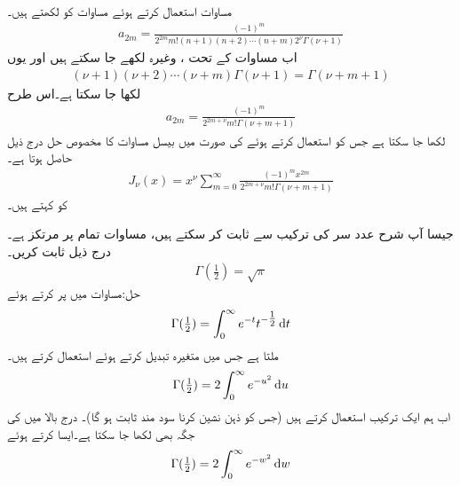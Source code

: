 مساوات  استعمال کرتے ہوئے  مساوات  کو لکھتے ہیں۔
\begin{align*}
a_{2m}=\frac{(-1)^m }{2^{2m}m!(n+1)(n+2)\cdots (n+m)2^{\nu}\Gamma(\nu+1)}
\end{align*}
اب مساوات  کے تحت ، 
 وغیرہ لکھے جا سکتے ہیں اور یوں
\begin{align*}
(\nu+1)(\nu+2)\cdots (\nu+m)\Gamma(\nu+1)=\Gamma(\nu+m+1)
\end{align*}
لکھا جا سکتا ہے۔اس طرح  
\begin{align}
a_{2m}=\frac{(-1)^m}{2^{2m+\nu}m!\Gamma(\nu+m+1)}
\end{align}
لکھا جا سکتا ہے جس کو استعمال کرتے ہوئے  کی صورت میں بیسل مساوات  کا مخصوص حل درج ذیل حاصل ہوتا ہے۔
\begin{align}\label{مساوات_بیسل_تسلسل_عمومی}
J_{\nu}(x)=x^{\nu}\sum_{m=0}^{\infty}\frac{(-1)^m x^{2m}}{2^{2m+\nu}m!\Gamma(\nu+m+1)}
\end{align}
 کو    کہتے ہیں۔

جیسا آپ شرح عدد سر کی ترکیب سے ثابت کر سکتے ہیں، مساوات  تمام  پر مرتکز ہے۔
درج ذیل ثابت کریں۔
\begin{align}\label{مساوات_بیسل_گیما_نیم}
\Gamma(\tfrac{1}{2})=\sqrt{\pi}
\end{align}
حل:مساوات  میں  پر کرتے ہوئے 
\begin{align*}
\Gamma(\tfrac{1}{2})=\int_{0}^{\infty}e^{-t} t^{-\tfrac{1}{2}}\dif t
\end{align*}
ملتا ہے جس میں متغیرہ تبدیل کرتے ہوئے  استعمال کرتے ہیں۔
\begin{align*}
\Gamma(\tfrac{1}{2})=2\int_{0}^{\infty}e^{-u^2}\dif u
\end{align*}
اب ہم ایک ترکیب استعمال کرتے ہیں (جس کو ذہن نشین کرنا سود مند ثابت ہو گا)۔ درج بالا میں  کی جگہ  بھی لکھا جا سکتا ہے۔ایسا کرتے ہوئے 
\begin{align*}
\Gamma(\tfrac{1}{2})=2\int_{0}^{\infty}e^{-w^2}\dif w
\end{align*}


